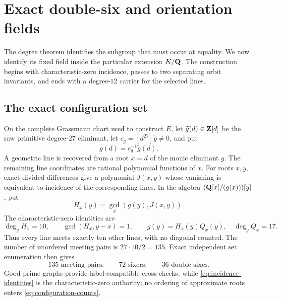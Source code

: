 \section{Exact double-six and orientation fields}
\label{sec:double-six-fields}

The degree theorem identifies the subgroup that must occur at equality.  We
now identify its fixed field inside the particular extension \(K/\mathbf Q\).  The
construction begins with characteristic-zero incidence, passes to two
separating orbit invariants, and ends with a degree-\(12\) carrier for the
selected lines.

\subsection{The exact configuration set}

On the complete Grassmann chart used to construct \(E\), let
\(\widetilde g(d)\in\mathbf Z[d]\) be the raw primitive degree-\(27\) eliminant,
let \(c_g=[d^{27}]\widetilde g\ne0\), and put
\begin{equation}
 g(d)=c_g^{-1}\widetilde g(d).
\label{eq:monic-eliminant}
\end{equation}
A geometric line is recovered from a root \(x=d\) of the monic eliminant
\(g\).
The remaining line coordinates are rational polynomial functions of \(x\).
For roots \(x,y\), exact divided differences give a polynomial \(J(x,y)\)
whose vanishing is equivalent to incidence of the corresponding lines.  In
the algebra \((\mathbf Q[x]/(g(x)))[y]\), put
\begin{equation}
 H_x(y)=\gcd_y(g(y),J(x,y)).
\label{eq:incidence-gcd}
\end{equation}
The characteristic-zero identities are
\begin{equation}
 \deg_yH_x=10,\qquad \gcd(H_x,y-x)=1,\qquad
 g(y)=H_x(y)Q_x(y),\quad \deg_yQ_x=17.
\label{eq:incidence-identities}
\end{equation}
Thus every line meets exactly ten other lines, with no diagonal counted.  The
number of unordered meeting pairs is \(27\cdot10/2=135\).  Exact independent
set enumeration then gives
\begin{equation}
 135\text{ meeting pairs},\qquad
 72\text{ sixers},\qquad
 36\text{ double-sixes}.
\label{eq:configuration-counts}
\end{equation}
Good-prime graphs provide label-compatible cross-checks, while
\cref{eq:incidence-identities} is the characteristic-zero authority; no
ordering of approximate roots enters \cref{eq:configuration-counts}.


